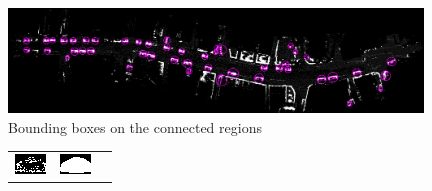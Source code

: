 \begin{figure}[tp]
 \centering
 \includegraphics[width=0.98\textwidth]{./img/ch-laser/pointsprojectedErodedWithBoundingBoxes.png}
 \caption{Bounding boxes on the connected regions}
 \label{fig:pointsprojectedErodedWithBoundingBoxes}
\end{figure}

\begin{figure}[tp]
    \centering
    \begin{tabular}{ccc}
        \includegraphics[width=0.98\textwidth]{./img/ch-laser/CurProj.png}&
        \includegraphics[width=0.98\textwidth]{./img/ch-laser/convHull.png}&

\end{tabular}
\end{figure}
